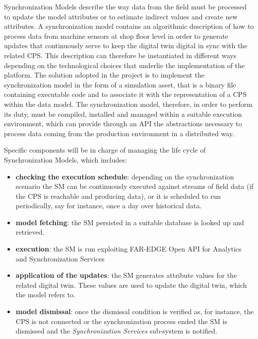 Synchronization Models describe the way data from the field must be processed to update the model attributes or to estimate indirect values and create new attributes. 
A synchronization model contains an algorithmic description of how to process data from machine sensors at shop floor level in order to generate updates that continuously serve to keep the digital twin digital in sync with the related CPS. 
This description can therefore be instantiated in different ways depending on the technological choices that underlie the implementation of the platform. 
The solution adopted in the project is to implement the synchronization model in the form of a simulation asset, that is a binary file containing executable code and to associate it with the representation of a CPS within the data model. The synchronization model, therefore, in order to perform its duty, must be compiled, installed and managed within a suitable execution environment, which can provide through an API the abstractions necessary to process data coming from the production environment in a distributed way.  


Specific components will be in charge of managing the life cycle of Synchronization Models, which includes: 
\begin{itemize}
\item \textbf{checking the execution schedule}: depending on the synchronization scenario the SM can be continuously executed against streams of field data (if the CPS is reachable and producing data), or it is scheduled to run periodically, say for instance, once a day over historical data. 
\item \textbf{model fetching}: the SM persisted in a suitable database is looked up and retrieved. 
\item \textbf{execution}: the SM is run exploiting FAR-EDGE Open API for Analytics and Synchronization Services
\item \textbf{application of the updates}: the SM generates attribute values for the related digital twin. These values are used to update the digital twin, which the model refers to.
\item \textbf{model dismissal}: once the dismissal condition is verified as, for instance, the CPS is not connected or the synchronization process ended the SM is dismissed and the \textit{Synchronization Services} sub-system is notified.
\end{itemize}

